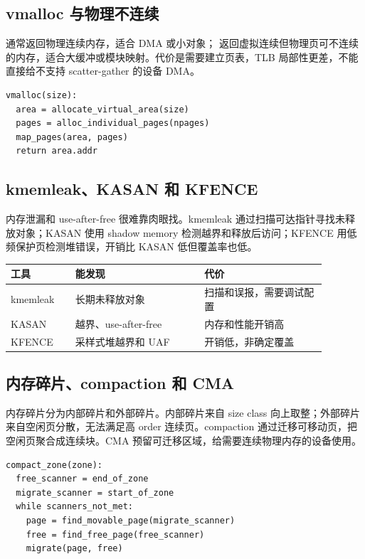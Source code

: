 \subsection{vmalloc 与物理不连续}

 通常返回物理连续内存，适合 DMA 或小对象； 返回虚拟连续但物理页可不连续的内存，适合大缓冲或模块映射。代价是需要建立页表，TLB 局部性更差，不能直接给不支持 scatter-gather 的设备 DMA。

\begin{lstlisting}
vmalloc(size):
  area = allocate_virtual_area(size)
  pages = alloc_individual_pages(npages)
  map_pages(area, pages)
  return area.addr
\end{lstlisting}

\subsection{kmemleak、KASAN 和 KFENCE}

内存泄漏和 use-after-free 很难靠肉眼找。kmemleak 通过扫描可达指针寻找未释放对象；KASAN 使用 shadow memory 检测越界和释放后访问；KFENCE 用低频保护页检测堆错误，开销比 KASAN 低但覆盖率也低。

\begin{longtable}{|p{0.18\linewidth}|p{0.36\linewidth}|p{0.34\linewidth}|}
\toprule
工具 & 能发现 & 代价 \\
\midrule
kmemleak & 长期未释放对象 & 扫描和误报，需要调试配置 \\\tablerowrule
KASAN & 越界、use-after-free & 内存和性能开销高 \\\tablerowrule
KFENCE & 采样式堆越界和 UAF & 开销低，非确定覆盖 \\
\bottomrule
\end{longtable}

\subsection{内存碎片、compaction 和 CMA}

内存碎片分为内部碎片和外部碎片。内部碎片来自 size class 向上取整；外部碎片来自空闲页分散，无法满足高 order 连续页。compaction 通过迁移可移动页，把空闲页聚合成连续块。CMA 预留可迁移区域，给需要连续物理内存的设备使用。

\begin{lstlisting}
compact_zone(zone):
  free_scanner = end_of_zone
  migrate_scanner = start_of_zone
  while scanners_not_met:
    page = find_movable_page(migrate_scanner)
    free = find_free_page(free_scanner)
    migrate(page, free)
\end{lstlisting}

